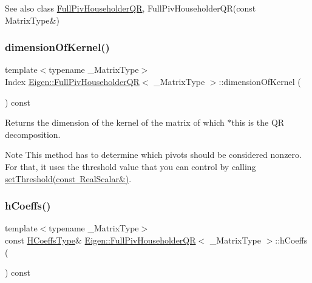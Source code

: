 \begin{DoxySeeAlso}{See also}
class \mbox{\hyperlink{class_eigen_1_1_full_piv_householder_q_r}{Full\+Piv\+Householder\+QR}}, Full\+Piv\+Householder\+Q\+R(const Matrix\+Type\&) 
\end{DoxySeeAlso}
\mbox{\label{class_eigen_1_1_full_piv_householder_q_r_a3b5fe5edc66acc01c45b16e728470aa0}} 
\subsubsection{\texorpdfstring{dimensionOfKernel()}{dimensionOfKernel()}}
{\footnotesize\ttfamily template$<$typename \+\_\+\+Matrix\+Type$>$ \\
Index \mbox{\hyperlink{class_eigen_1_1_full_piv_householder_q_r}{Eigen\+::\+Full\+Piv\+Householder\+QR}}$<$ \+\_\+\+Matrix\+Type $>$\+::dimension\+Of\+Kernel (\begin{DoxyParamCaption}{ }\end{DoxyParamCaption}) const\hspace{0.3cm}{\ttfamily [inline]}}

\begin{DoxyReturn}{Returns}
the dimension of the kernel of the matrix of which $\ast$this is the QR decomposition.
\end{DoxyReturn}
\begin{DoxyNote}{Note}
This method has to determine which pivots should be considered nonzero. For that, it uses the threshold value that you can control by calling \mbox{\hyperlink{class_eigen_1_1_full_piv_householder_q_r_a92277e572bf98245891015d12dd2b602}{set\+Threshold(const Real\+Scalar\&)}}. 
\end{DoxyNote}
\mbox{\label{class_eigen_1_1_full_piv_householder_q_r_a874fcd822871010f7961d9e94f1767e4}} 
\subsubsection{\texorpdfstring{hCoeffs()}{hCoeffs()}}
{\footnotesize\ttfamily template$<$typename \+\_\+\+Matrix\+Type$>$ \\
const \mbox{\hyperlink{struct_eigen_1_1internal_1_1true__type}{H\+Coeffs\+Type}}\& \mbox{\hyperlink{class_eigen_1_1_full_piv_householder_q_r}{Eigen\+::\+Full\+Piv\+Householder\+QR}}$<$ \+\_\+\+Matrix\+Type $>$\+::h\+Coeffs (\begin{DoxyParamCaption}{ }\end{DoxyParamCaption}) const\hspace{0.3cm}{\ttfamily [inline]}}

